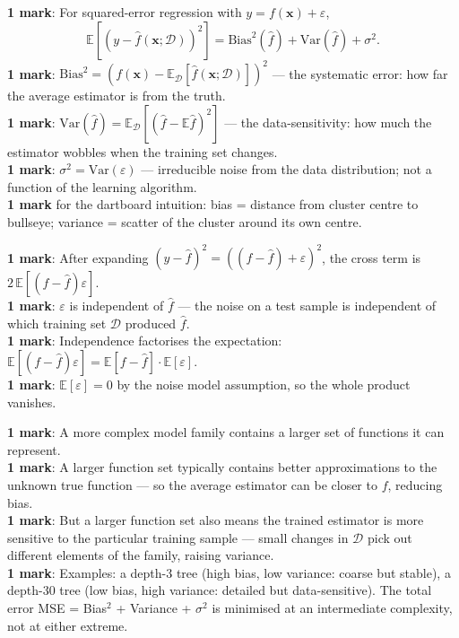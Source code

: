 \documentclass[11pt, a4paper]{article}
\begin{document}
\begin{exambox}
\textbf{1 mark}: For squared-error regression with $y = f(\mathbf{x}) + \varepsilon$,
\[
\mathbb{E}\!\left[(y - \hat f(\mathbf{x};\mathcal{D}))^2\right] = \text{Bias}^2(\hat f) + \mathrm{Var}(\hat f) + \sigma^2.
\]
\textbf{1 mark}: $\text{Bias}^2 = (f(\mathbf{x}) - \mathbb{E}_{\mathcal{D}}[\hat{f}(\mathbf{x};\mathcal{D})])^2$ — the systematic error: how far the average estimator is from the truth. \\
\textbf{1 mark}: $\mathrm{Var}(\hat{f}) = \mathbb{E}_{\mathcal{D}}[(\hat f - \mathbb{E}\hat f)^2]$ — the data-sensitivity: how much the estimator wobbles when the training set changes. \\
\textbf{1 mark}: $\sigma^2 = \mathrm{Var}(\varepsilon)$ — irreducible noise from the data distribution; not a function of the learning algorithm. \\
\textbf{1 mark} for the dartboard intuition: bias = distance from cluster centre to bullseye; variance = scatter of the cluster around its own centre.
\end{exambox}

\begin{exambox}
\textbf{1 mark}: After expanding $(y - \hat f)^2 = ((f - \hat f) + \varepsilon)^2$, the cross term is $2\,\mathbb{E}[(f - \hat f)\varepsilon]$. \\
\textbf{1 mark}: $\varepsilon$ is independent of $\hat f$ — the noise on a test sample is independent of which training set $\mathcal{D}$ produced $\hat{f}$. \\
\textbf{1 mark}: Independence factorises the expectation: $\mathbb{E}[(f - \hat f)\varepsilon] = \mathbb{E}[f - \hat f]\cdot\mathbb{E}[\varepsilon]$. \\
\textbf{1 mark}: $\mathbb{E}[\varepsilon] = 0$ by the noise model assumption, so the whole product vanishes.
\end{exambox}

\begin{exambox}
\textbf{1 mark}: A more complex model family contains a larger set of functions it can represent. \\
\textbf{1 mark}: A larger function set typically contains better approximations to the unknown true function — so the average estimator can be closer to $f$, reducing bias. \\
\textbf{1 mark}: But a larger function set also means the trained estimator is more sensitive to the particular training sample — small changes in $\mathcal{D}$ pick out different elements of the family, raising variance. \\
\textbf{1 mark}: Examples: a depth-3 tree (high bias, low variance: coarse but stable), a depth-30 tree (low bias, high variance: detailed but data-sensitive). The total error MSE = Bias$^2$ + Variance + $\sigma^2$ is minimised at an intermediate complexity, not at either extreme.
\end{exambox}
\end{document}
